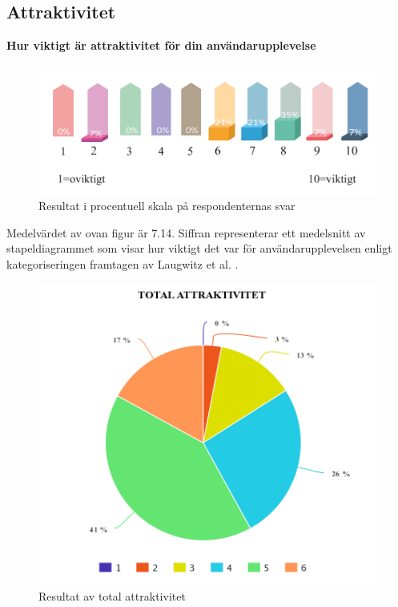 \subsection{Attraktivitet}


\centerline{\textbf{Hur viktigt är attraktivitet för 
din användarupplevelse}}

\begin{figure}[H]
  \centering
  \includegraphics[scale=0.7]{Rityta_11.pdf}
 \captionsetup{justification=centering,margin=2cm}
\caption{Resultat i procentuell skala på respondenternas svar}
\end{figure} 

Medelvärdet av ovan figur är 7.14. Siffran representerar ett medelsnitt av stapeldiagrammet som visar hur viktigt det var för användarupplevelsen enligt kategoriseringen framtagen av Laugwitz et al. \cite{Laugwitz2008ConstructionQuestionnaire}. 

  


\newpage
\begin{figure}[H]
  \centering
  \includegraphics[scale=0.4]{meta-chart-6.png}
 \captionsetup{justification=centering,margin=2cm}
  \caption{Resultat av total attraktivitet}
\end{figure}

